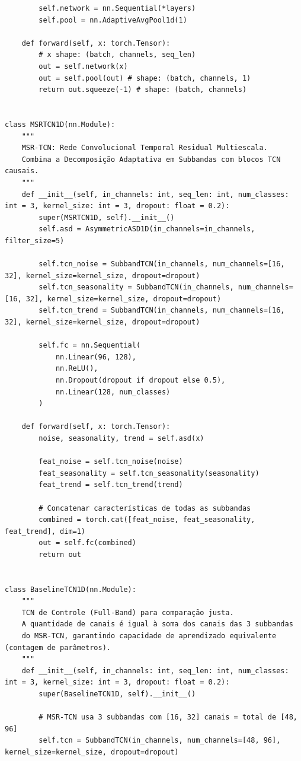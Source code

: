 \documentclass{article}
\begin{document}
\begin{verbatim}
        self.network = nn.Sequential(*layers)
        self.pool = nn.AdaptiveAvgPool1d(1)

    def forward(self, x: torch.Tensor):
        # x shape: (batch, channels, seq_len)
        out = self.network(x)
        out = self.pool(out) # shape: (batch, channels, 1)
        return out.squeeze(-1) # shape: (batch, channels)


class MSRTCN1D(nn.Module):
    """
    MSR-TCN: Rede Convolucional Temporal Residual Multiescala.
    Combina a Decomposição Adaptativa em Subbandas com blocos TCN causais.
    """
    def __init__(self, in_channels: int, seq_len: int, num_classes: int = 3, kernel_size: int = 3, dropout: float = 0.2):
        super(MSRTCN1D, self).__init__()
        self.asd = AsymmetricASD1D(in_channels=in_channels, filter_size=5)
        
        self.tcn_noise = SubbandTCN(in_channels, num_channels=[16, 32], kernel_size=kernel_size, dropout=dropout)
        self.tcn_seasonality = SubbandTCN(in_channels, num_channels=[16, 32], kernel_size=kernel_size, dropout=dropout)
        self.tcn_trend = SubbandTCN(in_channels, num_channels=[16, 32], kernel_size=kernel_size, dropout=dropout)
        
        self.fc = nn.Sequential(
            nn.Linear(96, 128),
            nn.ReLU(),
            nn.Dropout(dropout if dropout else 0.5),
            nn.Linear(128, num_classes)
        )
        
    def forward(self, x: torch.Tensor):
        noise, seasonality, trend = self.asd(x)
        
        feat_noise = self.tcn_noise(noise)
        feat_seasonality = self.tcn_seasonality(seasonality)
        feat_trend = self.tcn_trend(trend)
        
        # Concatenar características de todas as subbandas
        combined = torch.cat([feat_noise, feat_seasonality, feat_trend], dim=1)
        out = self.fc(combined)
        return out


class BaselineTCN1D(nn.Module):
    """
    TCN de Controle (Full-Band) para comparação justa.
    A quantidade de canais é igual à soma dos canais das 3 subbandas
    do MSR-TCN, garantindo capacidade de aprendizado equivalente (contagem de parâmetros).
    """
    def __init__(self, in_channels: int, seq_len: int, num_classes: int = 3, kernel_size: int = 3, dropout: float = 0.2):
        super(BaselineTCN1D, self).__init__()
        
        # MSR-TCN usa 3 subbandas com [16, 32] canais = total de [48, 96]
        self.tcn = SubbandTCN(in_channels, num_channels=[48, 96], kernel_size=kernel_size, dropout=dropout)
        

\end{verbatim}
\end{document}
